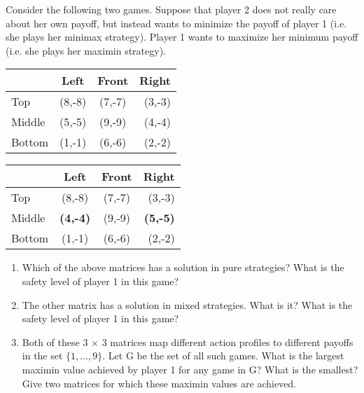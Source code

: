 \documentclass[../main.tex]{subfiles}
\begin{document}
\begin{question}[Minimax]
	Consider the following two games. Suppose that player 2 does not really care about her own payoff, but instead wants to minimize the payoff of player 1 (i.e. she plays her minimax strategy). Player 1 wants to maximize her minimum payoff (i.e. she plays her maximin strategy).

	\begin{center}
	\begin{tabular}{|l|c|c|r|}
	    \hline
	    & Left & Front & Right \\
	    \hline
	    Top & (8,-8) & (7,-7) & (3,-3) \\
	    \hline
	    Middle & (5,-5) & (9,-9) & (4,-4) \\
	    \hline
	    Bottom & (1,-1) & (6,-6) & (2,-2) \\
	    \hline
	\end{tabular}
	\quad
	\begin{tabular}{|l|c|c|r|}
	    \hline
	    & Left & Front & Right \\
	    \hline
	    Top & (8,-8) & (7,-7) & (3,-3) \\
	    \hline
	    Middle & \textbf{(4,-4)} & (9,-9) & \textbf{(5,-5)} \\
	    \hline
	    Bottom & (1,-1) & (6,-6) & (2,-2) \\
	    \hline
	\end{tabular}
	\end{center}

	\begin{enumerate}
		\item Which of the above matrices has a solution in pure strategies? What is the safety level of player 1 in this game?
		\item The other matrix has a solution in mixed strategies. What is it? What is the safety level of player 1 in this game?
		\item Both of these 3 $\times$ 3 matrices map different action profiles to different payoffs in the set $\{1, ... ,9\}$.
		Let G be the set of all such games. What is the largest maximin value achieved by player 1 for any
		game in G? What is the smallest? Give two matrices for which these maximin values are achieved.
	\end{enumerate}

\end{question}
\end{document}
